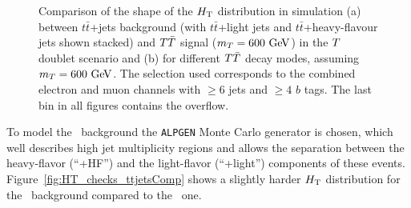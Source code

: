 \begin{figure}[h!tb]\begin{center}
	\caption{Comparison of the shape of the $\HT$ distribution in 
        simulation (a) between $t\bar{t}$+jets background (with $t\bar{t}$+light 
        jets  and $t\bar{t}$+heavy-flavour jets shown stacked) 
        and $\TT$ signal ($m_{\T}=600\gev$) in the $\T$ doublet scenario
        and (b) for different $\TT$ decay modes, assuming $m_{\T}=600\gev$.
        The selection used corresponds to the combined electron and muon channels with $\geq 6$ jets and $\geq 4$ $b$ tags. 
        The last bin in all figures contains the overflow.}
\end{center}\end{figure}

To model the \ttbar\ background
the \texttt{ALPGEN} Monte Carlo generator is chosen, which well
describes high jet multiplicity regions and allows the separation
between the heavy-flavor (``\ttbar+HF'') and the light-flavor
(``\ttbar+light'') components of these events.
Figure~\ref{fig:HT_checks_ttjetsComp} shows a slightly harder
$\HT$ distribution for the \tthf\ background compared to the
\ttlf\ one.


